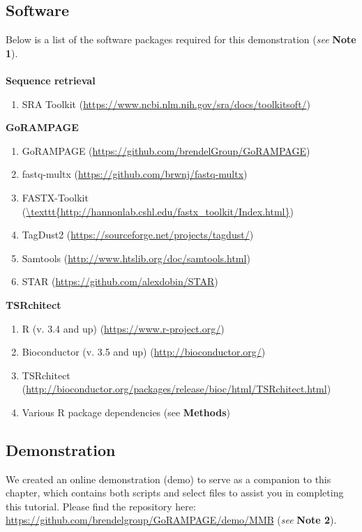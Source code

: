 \documentclass[runningheads,a4paper]{llncs}
\begin{document}
\begin{linenumbers}
\subsection{Software}
Below is a list of the software packages required for this demonstration (\textit{see} \textbf{Note 1}).\\
\\
\textbf{Sequence retrieval}
\begin{enumerate}
\item SRA Toolkit \cite{Leinonen:2011iw}  (\url{https://www.ncbi.nlm.nih.gov/sra/docs/toolkitsoft/})
\end{enumerate}
\textbf{GoRAMPAGE}
\begin{enumerate}
\item GoRAMPAGE \cite{Brendel:2016ab} (\url{https://github.com/brendelGroup/GoRAMPAGE})
\item fastq-multx \cite{Aronesty:2013gt} (\url{https://github.com/brwnj/fastq-multx})
\item FASTX-Toolkit \cite{citeulike:9103573} (\url{\texttt{http://hannonlab.cshl.edu/fastx\_toolkit/Index.html}})
\item TagDust2 \cite{Lassmann:2015gs} (\url{https://sourceforge.net/projects/tagdust/})
\item Samtools \cite{Li:2009ka} (\url{http://www.htslib.org/doc/samtools.html})
\item STAR \cite{Dobin:2016kq} (\url{https://github.com/alexdobin/STAR})
\end{enumerate}
\textbf{TSRchitect}
\begin{enumerate}
\item R (v. 3.4 and up) \cite{RCore:2017ab} (\url{https://www.r-project.org/})
\item Bioconductor (v. 3.5 and up) \cite{Lawrence:2014gy} (\url{http://bioconductor.org/})
\item TSRchitect \cite{Raborn:2017ab} (\url{http://bioconductor.org/packages/release/bioc/html/TSRchitect.html})
\item Various R package dependencies (see \textbf{Methods})
\end{enumerate}

\subsection{Demonstration}
We created an online demonstration (demo) to serve as a companion to this chapter, which contains both scripts and select files to assist you in completing this tutorial.
Please find the repository here:\\
\url{https://github.com/brendelgroup/GoRAMPAGE/demo/MMB} (\textit{see} \textbf{Note 2}).


\end{linenumbers}
\end{document}

